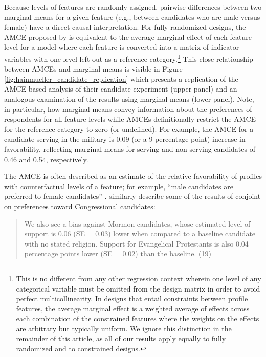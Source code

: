 \documentclass[a4paper,12pt]{article}\usepackage[]{graphicx}\usepackage[]{color}
\begin{document}
Because levels of features are randomly assigned, pairwise differences between two marginal means for a given feature (e.g., between candidates who are male versus female) have a direct causal interpretation. For fully randomized designs, the AMCE proposed by \citet{HainmuellerHopkinsYamamoto2014} is equivalent to the average marginal effect of each feature level for a model where each feature is converted into a matrix of indicator variables with one level left out as a reference category.\footnote{This is no different from any other regression context wherein one level of any categorical variable must be omitted from the design matrix in order to avoid perfect multicollinearity. In designs that entail constraints between profile features, the average marginal effect is a weighted average of effects across each combination of the constrained features where the weights on the effects are arbitrary but typically uniform. We ignore this distinction in the remainder of this article, as all of our results apply equally to fully randomized and to constrained designs.} This close relationship between AMCEs and marginal means is visible in Figure \ref{fig:hainmueller_candidate_replication} which presents a replication of the AMCE-based analysis of their candidate experiment (upper panel) and an analogous examination of the results using marginal means (lower panel). Note, in particular, how marginal means convey information about the preferences of respondents for all feature levels while AMCEs definitionally restrict the AMCE for the reference category to zero (or undefined). For example, the AMCE for a candidate serving in the military is 0.09 (or a 9-percentage point) increase in favorability, reflecting marginal means for serving and non-serving candidates of 0.46 and 0.54, respectively.

The AMCE is often described as an estimate of the relative favorability of profiles with counterfactual levels of a feature; for example, ``male candidates are preferred to female candidates'' \citep[6]{TeeleKallaRosenbluth2018}. \citet{HainmuellerHopkinsYamamoto2014} similarly describe some of the results of conjoint on preferences toward Congressional candidates:

\begin{quote}
We also see a bias against Mormon candidates, whose estimated level of support is 0.06 (SE = 0.03) lower when compared to a baseline candidate with no stated religion. Support for Evangelical Protestants is also 0.04 percentage points lower (SE = 0.02) than the baseline. (19)
\end{quote}
\end{document}
